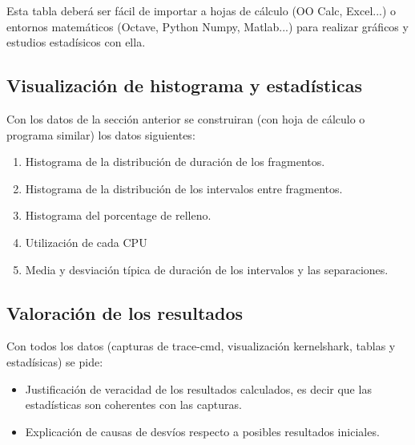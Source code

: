 \documentclass[a4paper,11pt,spanish,twoside]{article}
\begin{document}
Esta tabla deberá ser fácil de importar a hojas de cálculo (OO Calc,
Excel...) o entornos matemáticos (Octave, Python Numpy, Matlab...) para
realizar gráficos y estudios estadísicos con ella.

\subsection{Visualización de histograma y estadísticas}
\label{sec:estadistica}

Con los datos de la sección anterior se construiran (con hoja de
cálculo o programa similar) los datos siguientes:

\begin{enumerate}
\item Histograma de la distribución de duración de los fragmentos.
\item Histograma de la distribución de los intervalos entre
  fragmentos.
\item Histograma del porcentage de relleno.
\item Utilización de cada CPU
\item Media y desviación típica de duración de los intervalos y las
  separaciones.

\end{enumerate}

\subsection{Valoración de los resultados}
\label{sec:valoracion}

Con todos los datos (capturas de trace-cmd, visualización kernelshark,
tablas y estadísicas) se pide:

\begin{itemize}
\item Justificación de veracidad de los resultados calculados, es
  decir que las estadísticas son coherentes con las capturas.

\item Explicación de causas de desvíos respecto a posibles resultados
  iniciales.
\end{itemize}




% 
% 
\end{document}
